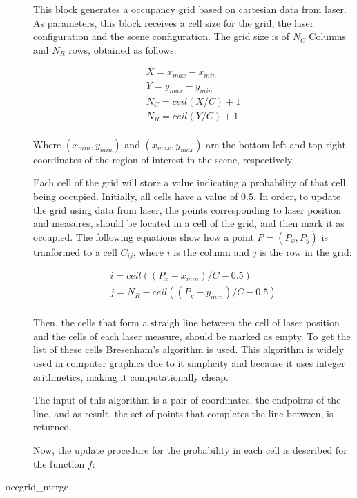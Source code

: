 \begin{description}
This block generates a occupancy grid based on cartesian data from laser. As parameters, this block receives a cell size for the grid, the laser configuration and the scene configuration. The grid size is of $N_C$ Columns and $N_R$ rows, obtained as follows:

\begin{eqnarray*}
X = x_{max}-x_{min} \\
Y = y_{max}-y_{min} \\
N_C = ceil(X/C)+1 \\
N_R = ceil(Y/C)+1 \\
\end{eqnarray*}

Where $(x_{min}, y_{min})$ and $(x_{max}, y_{max})$ are the bottom-left and top-right coordinates of the region of interest in the scene, respectively.

Each cell of the grid will store a value indicating a probability of that cell being occupied. Initially, all cells have a value of $0.5$. In order, to update the grid using data from laser, the points corresponding to laser position and measures, should be located in a cell of the grid, and then mark it as occupied. The following equations show how a point $P = (P_x, P_y)$ is tranformed to a cell $C_{ij}$, where $i$ is the column and $j$ is the row in the grid:

\begin{eqnarray*}
i = ceil((P_x - x_{min})/C - 0.5) \\
j = N_R - ceil((P_y - y_{min})/C - 0.5) \\
\end{eqnarray*}

Then, the cells that form a straigh line between the cell of laser position and the cells of each laser measure, should be marked as empty. To get the list of these cells Bresenham's algorithm  is used. This algorithm is widely used in computer graphics due to it simplicity and because it uses integer arithmetics, making it computationally cheap.

The input of this algorithm is a pair of coordinates, the endpoints of the line, and as result, the set of points that completes the line between, is returned.

Now, the update procedure for the probability in each cell is described for the function $f$:


\item[occgrid\_merge] \hfill


\end{description}
